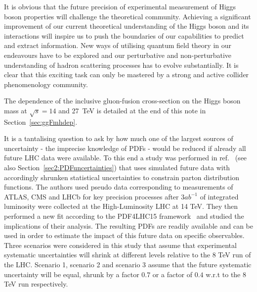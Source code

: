It is obvious that the future precision of experimental measurement of Higgs boson properties will challenge the theoretical community.
Achieving a significant improvement of our current theoretical understanding of the Higgs boson and its interactions will inspire us to push the boundaries of our capabilities to predict and extract information.
New ways of utilising quantum field theory in our endeavours have to be explored and our perturbative and non-perturbative understanding of hadron scattering processes has to evolve substantially. 
It is clear that this exciting task can only be mastered by a strong and active collider phenomenology community.
 
The dependence of the inclusive gluon-fusion cross-section on the Higgs boson mass at $\sqrt{s}=14$ and 27~TeV
is detailed at the end of this note in Section~\ref{sec:ggFmhdep}.


It is a tantalising question to ask by how much one of the largest sources of uncertainty - the imprecise knowledge of PDFs - would be reduced if already all future LHC data were available.
To this end a study was performed in ref.~\cite{Khalek:2018mdn} (see also Section~\ref{sec2:PDFuncertainties}) that uses simulated future data with accordingly shrunken statistical uncertainties to constrain parton distribution functions.
The authors used pseudo data corresponding to measurements of ATLAS, CMS and LHCb for key precision processes after $3 ab^{-1}$ of integrated luminosity were collected at the High-Luminosity LHC at 14 TeV.
They then performed a new fit according to the PDF4LHC15 framework~\cite{Botje:2011sn} and studied the implications of their analysis.
The resulting PDFs are readily available and can be used in order to estimate the impact of this future data on specific observables. 
Three scenarios were considered in this study that assume that experimental systematic uncertainties will shrink at different levels relative to the 8 TeV run of the LHC.
Scenario 1, scenario 2 and scenario 3 assume that the future systematic uncertainty will be equal, shrunk by a factor $0.7$ or a factor of $0.4$ w.r.t to the 8 TeV run respectively.

